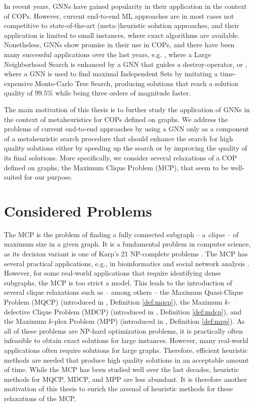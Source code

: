 \documentclass[draft,final]{vutinfth} %
\begin{document}
In recent years, GNNs have gained popularity in their application in the context of COPs. However, current end-to-end ML approaches are in most cases not competitive to state-of-the-art (meta-)heuristic solution approaches, and their application is limited to small instances, where exact algorithms are available. Nonetheless, GNNs show promise in their use in COPs, and there have been many successful applications over the last years, e.g. 
\cite{Oberweger2022}, where a Large Neighborhood Search is enhanced by a GNN that guides a destroy-operator, or \cite{NEURIPS2021_0db2e204}, where a GNN is used to find maximal Independent Sets by imitating a time-expensive Monte-Carlo Tree Search, producing solutions that reach a solution quality of $99.5\%$ while being three orders of magnitude faster. 

The main motivation of this thesis is to further study the application of GNNs in the context of metaheuristics for COPs defined on graphs. We address the problems of current end-to-end approaches by using a GNN only as a component of a metaheuristic search procedure that should enhance the search for high quality solutions either by speeding up the search or by improving the quality of its final solutions. More specifically, we consider several relaxations of a COP defined on graphs, the Maximum Clique Problem (MCP), that seem to be well-suited for our purpose. 

\section{Considered Problems}
The MCP is the problem of finding a fully connected subgraph -- a \textit{clique} -- of maximum size in a given graph. It is a fundamental problem in computer science, as its decision variant is one of Karp's 21 NP-complete problems \cite{Karp1972}. The MCP has several practical applications, e.g.,  in bioinformatics \cite{Dognin2010} and social network analysis \cite{Pattillo_network_analysis_2013}. However, for some real-world applications that require identifying dense subgraphs, the MCP is too strict a model. This leads to the introduction of several clique relaxations such as -- among others -- the Maximum Quasi-Clique Problem (MQCP) (introduced in \cite{Abello2002}, Definition \ref{def:mqcp}), the Maximum $k$-defective Clique Problem (MDCP) (introduced in \cite{Yu2006}, Definition \ref{def:mdcp}), and the Maximum $k$-plex Problem (MPP) (introduced in \cite{Seidman1978}, Definition \ref{def:mpp}). 
As all of these problems are NP-hard optimization problems, it is practically often infeasible to obtain exact solutions for large instances. However, many real-world applications often require solutions for large graphs. Therefore, efficient heuristic methods are needed that produce high quality solutions in an acceptable amount of time. While the MCP has been studied well over the last decades, heuristic methods for MQCP, MDCP, and MPP are less abundant. It is therefore another motivation of this thesis to enrich the arsenal of heuristic methods for these relaxations of the MCP. 
\end{document}
